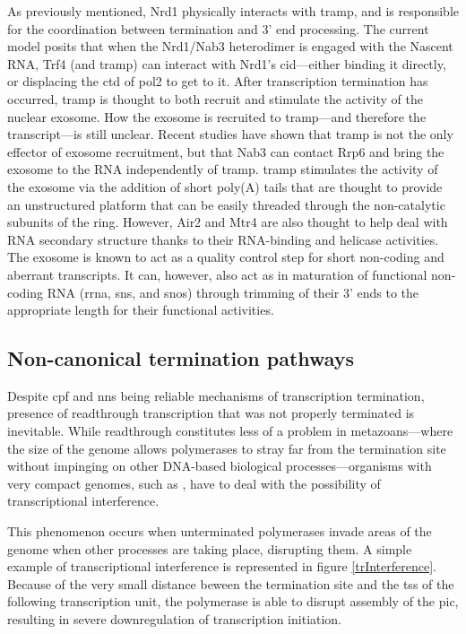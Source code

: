 As previously mentioned, Nrd1 physically interacts with \gls{tramp}, and is responsible for the coordination between termination and 3' end processing.
The current model posits that when the Nrd1/Nab3 heterodimer is engaged with the Nascent RNA, Trf4 (and \gls{tramp}) can interact with Nrd1's \gls{cid}---either binding it directly, or displacing the \gls{ctd} of \gls{pol2} to get to it\cite{tudek:2014:molecular}.
After transcription termination has occurred, \gls{tramp} is thought to both recruit and stimulate the activity of the nuclear exosome.
How the exosome is recruited to \gls{tramp}---and therefore the transcript---is still unclear.
Recent studies have shown that \gls{tramp} is not the only effector of exosome recruitment, but that Nab3 can contact Rrp6 and bring the exosome to the RNA independently of \gls{tramp}.
\gls{tramp} stimulates the activity of the exosome via the addition of short poly(A) tails that are thought to provide an unstructured platform that can be easily threaded through the non-catalytic subunits of the ring. 
However, Air2 and Mtr4 are also thought to help deal with RNA secondary structure thanks to their RNA-binding and helicase activities.  
The exosome is known to act as a quality control step for short non-coding and aberrant transcripts.
It can, however, also act as in maturation of functional non-coding RNA (\gls{rrna}, \gls{sns}, and \gls{snos}) through trimming of their 3' ends to the appropriate length for their functional activities.

\subsection{Non-canonical termination pathways}

Despite \gls{cpf} and \gls{nns} being reliable mechanisms of transcription termination, presence of readthrough transcription that was not properly terminated is inevitable.
While readthrough constitutes less of a problem in metazoans---where the size of the genome allows polymerases to stray far from the termination site without impinging on other DNA-based biological processes---organisms with very compact genomes, such as \cer{}, have to deal with the possibility of transcriptional interference.

This phenomenon occurs when unterminated polymerases invade areas of the genome when other processes are taking place, disrupting them.
A simple example of transcriptional interference is represented in figure \ref{trInterference}.
Because of the very small distance beween the termination site and the \gls{tss} of the following transcription unit, the polymerase is able to disrupt assembly of the \gls{pic}, resulting in severe downregulation of transcription initiation.

